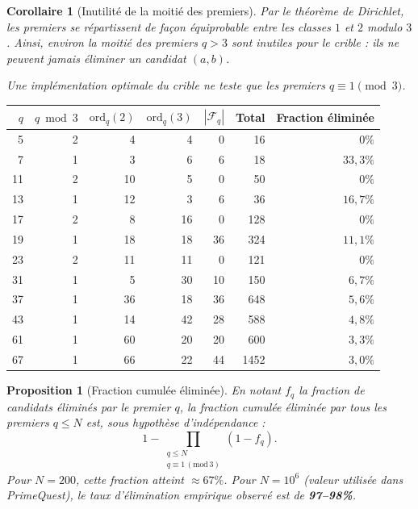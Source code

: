 \documentclass[12pt,a4paper]{article}
\newtheorem{corollaire}{Corollaire}
\newtheorem{proposition}{Proposition}
\theoremstyle{definition}
\newcommand{\ord}{\mathrm{ord}}
\begin{document}
\begin{corollaire}[Inutilité de la moitié des premiers]
  Par le théorème de Dirichlet, les premiers se répartissent
  de façon équiprobable entre les classes $1$ et $2$ modulo $3$.
  Ainsi, environ la moitié des premiers $q > 3$ sont inutiles
  pour le crible : ils ne peuvent jamais éliminer un candidat $(a,b)$.

  Une implémentation optimale du crible ne teste que les premiers
  $q \equiv 1 \pmod{3}$.
\end{corollaire}

\begin{center}
\renewcommand{\arraystretch}{1.2}
\begin{tabular}{rrrrrrr}
  \toprule
  $q$ & $q \bmod 3$ & $\ord_q(2)$ & $\ord_q(3)$
      & $|\mathcal{F}_q|$ & Total & Fraction éliminée \\
  \midrule
   5  & 2 & 4 & 4 & 0  & 16   & $0\%$ \\
   7  & 1 & 3 & 6 & 6  & 18   & $33{,}3\%$ \\
  11  & 2 & 10 & 5 & 0 & 50   & $0\%$ \\
  13  & 1 & 12 & 3 & 6 & 36   & $16{,}7\%$ \\
  17  & 2 & 8 & 16 & 0 & 128  & $0\%$ \\
  19  & 1 & 18 & 18 & 36 & 324 & $11{,}1\%$ \\
  23  & 2 & 11 & 11 & 0 & 121 & $0\%$ \\
  31  & 1 & 5 & 30 & 10 & 150 & $6{,}7\%$ \\
  37  & 1 & 36 & 18 & 36 & 648 & $5{,}6\%$ \\
  43  & 1 & 14 & 42 & 28 & 588 & $4{,}8\%$ \\
  61  & 1 & 60 & 20 & 20 & 600 & $3{,}3\%$ \\
  67  & 1 & 66 & 22 & 44 & 1452 & $3{,}0\%$ \\
  \bottomrule
\end{tabular}
\end{center}

\begin{proposition}[Fraction cumulée éliminée]
  En notant $f_q$ la fraction de candidats éliminés par le premier $q$,
  la fraction cumulée éliminée par tous les premiers $q \leq N$ est,
  sous hypothèse d'indépendance :
  \[
    1 - \prod_{\substack{q \leq N \\ q \equiv 1\, (\text{mod}\, 3)}}
    (1 - f_q).
  \]
  Pour $N = 200$, cette fraction atteint $\approx 67\%$.
  Pour $N = 10^6$ (valeur utilisée dans PrimeQuest),
  le taux d'élimination empirique observé est de \textbf{97--98\%}.
\end{proposition}
\end{document}

